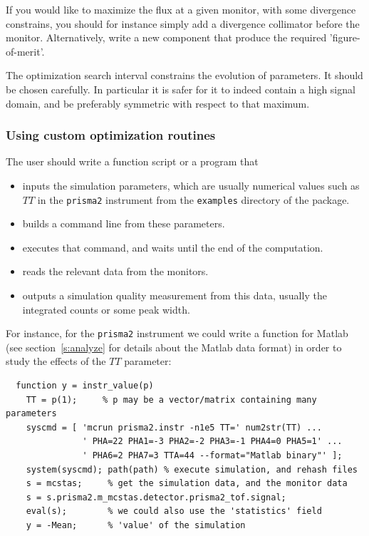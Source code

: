 If you would like to maximize the flux at a given monitor, with some
divergence constrains, you should for instance simply add a divergence
collimator before the monitor. Alternatively, write a new component
that produce the required 'figure-of-merit'.

The optimization search interval constrains the evolution of
parameters. It should be chosen carefully. In particular it is safer
for it to indeed contain a high signal domain, and be preferably
symmetric with respect to that maximum.

\subsubsection{Using custom optimization routines}
The user should write a function script or a program that
\begin{itemize}
\item inputs the simulation parameters, which are usually numerical values such
  as $TT$ in the \verb+prisma2+ instrument from the \verb+examples+ directory of
  the package.
\item builds a command line from these parameters.
\item executes that command, and waits until the end of the computation.
\item reads the relevant data from the monitors.
\item outputs a simulation quality measurement from this data, usually the
  integrated counts or some peak width.
\end{itemize}

For instance, for the \verb+prisma2+ instrument we could write a function for
Matlab (see section~\ref{s:analyze} for details about the Matlab data format) in
order to study the effects of the $TT$ parameter:
\begin{lstlisting}
  function y = instr_value(p)
    TT = p(1);     % p may be a vector/matrix containing many parameters
    syscmd = [ 'mcrun prisma2.instr -n1e5 TT=' num2str(TT) ...
               ' PHA=22 PHA1=-3 PHA2=-2 PHA3=-1 PHA4=0 PHA5=1' ...
               ' PHA6=2 PHA7=3 TTA=44 --format="Matlab binary"' ];
    system(syscmd); path(path) % execute simulation, and rehash files
    s = mcstas;     % get the simulation data, and the monitor data
    s = s.prisma2.m_mcstas.detector.prisma2_tof.signal;
    eval(s);        % we could also use the 'statistics' field
    y = -Mean;      % 'value' of the simulation
\end{lstlisting}

